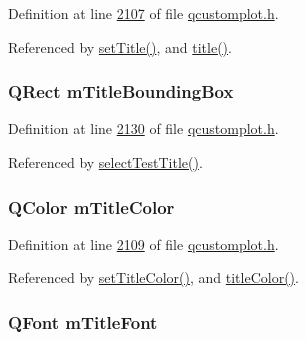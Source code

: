 Definition at line \hyperlink{a00116_source_l02107}{2107} of file \hyperlink{a00116_source}{qcustomplot.\+h}.



Referenced by \hyperlink{a00115_source_l05884}{set\+Title()}, and \hyperlink{a00116_source_l01953}{title()}.

\hypertarget{a00116_ab64b411eef7fd9d890c871993116d289}{
\subsubsection[{m\+Title\+Bounding\+Box}]{\setlength{\rightskip}{0pt plus 5cm}Q\+Rect m\+Title\+Bounding\+Box}}\label{a00116_ab64b411eef7fd9d890c871993116d289}


Definition at line \hyperlink{a00116_source_l02130}{2130} of file \hyperlink{a00116_source}{qcustomplot.\+h}.



Referenced by \hyperlink{a00115_source_l08129}{select\+Test\+Title()}.

\hypertarget{a00116_a56e768edac99110852bf82826da144b9}{
\subsubsection[{m\+Title\+Color}]{\setlength{\rightskip}{0pt plus 5cm}Q\+Color m\+Title\+Color}}\label{a00116_a56e768edac99110852bf82826da144b9}


Definition at line \hyperlink{a00116_source_l02109}{2109} of file \hyperlink{a00116_source}{qcustomplot.\+h}.



Referenced by \hyperlink{a00115_source_l05902}{set\+Title\+Color()}, and \hyperlink{a00116_source_l01955}{title\+Color()}.

\hypertarget{a00116_ac17173c9dcdc7c84878a6ee801fafc2e}{
\subsubsection[{m\+Title\+Font}]{\setlength{\rightskip}{0pt plus 5cm}Q\+Font m\+Title\+Font}}\label{a00116_ac17173c9dcdc7c84878a6ee801fafc2e}


